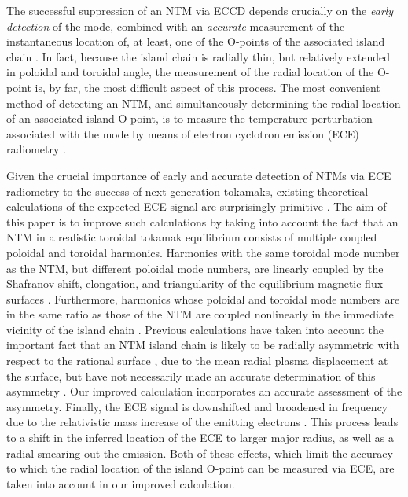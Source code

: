 \documentclass{iopjournal}
\begin{document}
The successful suppression of an NTM via ECCD depends crucially on the {\em early detection}\/ of the mode, combined with an {\em accurate}\/ measurement   of 
the instantaneous location of, at least, one of the O-points  of the associated island chain \cite{eccd6}. In fact, because the island chain is radially thin, 
but relatively extended in poloidal and toroidal angle, the measurement  of the radial location of the O-point is, by far,  the most difficult aspect of
this process. The most convenient method of  detecting an NTM, and simultaneously determining the radial location of an associated island O-point, is to measure the temperature perturbation associated with the mode by means of electron cyclotron emission (ECE) radiometry \cite{ntm2,ece1,ece2,ece4}.

Given the crucial importance of early and accurate detection of NTMs via ECE radiometry to the success of next-generation tokamaks, existing theoretical calculations of
the expected ECE signal are surprisingly primitive \cite{eccd6,ece4,ece4a}. The aim of this paper is to
improve such calculations by taking into account the fact that an NTM  in a realistic toroidal tokamak equilibrium consists of multiple coupled poloidal and toroidal harmonics. Harmonics with the same toroidal mode number as the NTM, but different poloidal mode numbers, are linearly coupled by the
Shafranov shift, elongation, and triangularity of the equilibrium magnetic flux-surfaces \cite{tear2,tear3,tear5}. Furthermore, harmonics whose poloidal and
toroidal mode numbers are in the same ratio as those of the NTM are coupled nonlinearly in the immediate vicinity of the island chain \cite{ntm1,ntm2}.
Previous calculations have taken into account the important fact that an NTM island chain is likely to be radially asymmetric with respect to the rational surface \cite{ece6a,ece6},
due to the mean radial plasma displacement at the  surface, but have not necessarily made an accurate
determination of this asymmetry \cite{eccd6}. Our improved calculation incorporates an accurate assessment of the asymmetry. Finally, the ECE signal 
is downshifted and broadened in frequency due to the relativistic mass increase of the emitting electrons \cite{ece1,ece2,ece5}.  This process leads to a shift in the inferred location
of the ECE  to larger major radius, as well as a radial smearing out the emission. Both of these effects, which limit the accuracy to which the
radial location of the island O-point can be measured via ECE,  are taken into account in our improved calculation.
\end{document}
